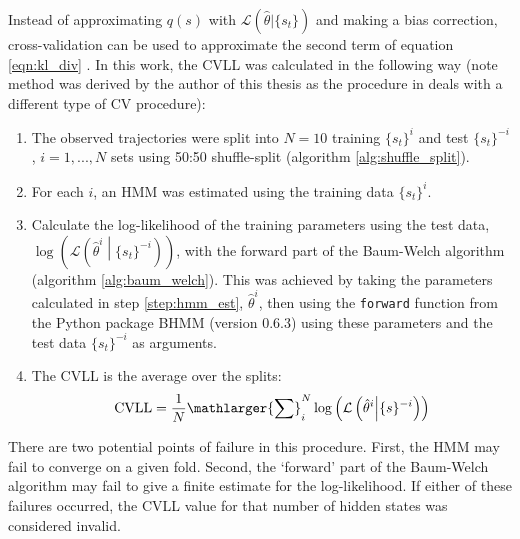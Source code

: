 Instead of approximating $q(s)$ with $\mathcal{L}\left(\hat{\theta}|\{s_t\}\right)$ and making a bias correction, cross-validation can be used to approximate the second term of equation \ref{eqn:kl_div} \cite{celeuxSelectingHiddenMarkov2008}. In this work, the CVLL was calculated in the following way (note method was derived by the author of this thesis as the procedure in \cite{celeuxSelectingHiddenMarkov2008} deals with a different type of CV procedure): 
\begin{enumerate}
    \item The observed trajectories were split into $N = 10$ training $\{s_t\}^{i}$ and test $\{s_t\}^{-i}$, $i = 1, ..., N$ sets using 50:50 shuffle-split (algorithm \ref{alg:shuffle_split}). 
    \item For each $i$, an HMM was estimated using the training data $\{s_t\}^{i}$.\label{step:hmm_est} 
    \item Calculate the log-likelihood of the training parameters using the test data,  $\log{\left(\mathcal{L}\left(\hat{\theta}^{i}\middle|\{s_t\}^{-i}\right)\right)}$, with the forward part of the Baum-Welch algorithm (algorithm \ref{alg:baum_welch}). This was achieved by taking the parameters calculated in step \ref{step:hmm_est}, $\hat{\theta}^{i}$, then using the \texttt{forward} function from the Python package BHMM (version 0.6.3) using these parameters and the test data $\{s_{t}\}^{-i}$ as arguments. \label{step:cvll}
    \item The CVLL is the average over the splits: 
    \begin{equation}
        \operatorname{CVLL} = \frac{1}{N}\mathlarger{\sum}_{i}^{N}\log{\left(\mathcal{L}\left(\hat{\theta}^{i} \middle | \{s\}^{-i}\right)\right)}
    \end{equation}
\end{enumerate}
There are two potential points of failure in this procedure. First, the HMM may fail to converge on a given fold. Second, the `forward' part of the Baum-Welch algorithm may fail to give a finite estimate for the log-likelihood. If either of these failures occurred, the CVLL value for that number of hidden states was considered invalid. 

